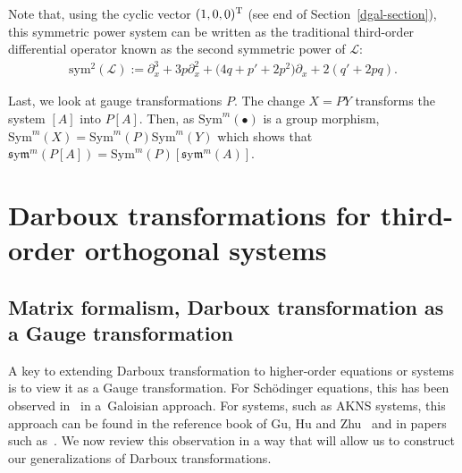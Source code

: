 \documentclass[10pt,a4paper]{amsart}
\numberwithin{equation}{section}
\def\Sym{\mathrm{Sym}}
\def\sym{\mathfrak{s}\mathrm{y}\mathfrak{m}}
\begin{document}
Note that, using the cyclic vector $(1,0,0)^{\rm T}$ (see end of Section~\ref{dgal-section}), this symmetric power system can be written as the traditional third-order differential operator known as the second symmetric power of $\mathcal{L}$:
\begin{gather*}%
\textrm{sym}^2 ( \mathcal{L} ):= \partial_x^3 +3p \partial_x^2 + \big(4q + p' +2p^2\big) \partial_x +2 (q' +2pq).
\end{gather*}

Last, we look at gauge transformations $P$.
The change $X = P Y$ transforms the system $[A]$ into $P[A]$. Then,
as $\Sym^m(\bullet)$ is a group morphism, $\Sym^{m}(X)=\Sym^{m}(P) \Sym^m(Y)$
which shows that $\sym^m (P[A]) = \Sym^{m}(P)[ \sym^m (A)]$.

\section{Darboux transformations for third-order orthogonal systems}

\subsection{Matrix formalism, Darboux transformation as a Gauge transformation}
A key to extending Darboux transformation to higher-order equations or systems is to view it as a Gauge transformation. For Sch\"odinger equations, this has been observed in~\cite{AP2,ac2,AP1} in a~Galoisian approach. For systems, such as AKNS systems, this approach can be found in the reference book of Gu, Hu and Zhu~\cite[Section~1.3, p.~18]{GHZ} and in papers such as~\cite{JiMoSaZu17r,JiMoSaZu18v,JiMoSaZu19f,YaRu13m}.
We now review this observation in a way that will allow us to construct our generalizations of Darboux transformations.
\end{document}
